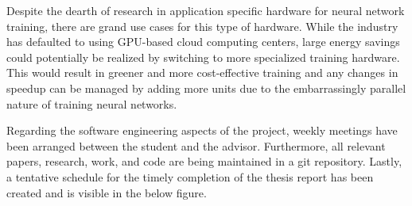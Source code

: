 \documentclass[a4paper]{article}
\begin{document}
\par 
Despite the dearth of research in application specific hardware for neural network training, there are grand use cases for this type of hardware. While the industry has defaulted to using GPU-based cloud computing centers, large energy savings could potentially be realized by switching to more specialized training hardware. This would result in greener and more cost-effective training and any changes in speedup can be managed by adding more units due to the embarrassingly parallel nature of training neural networks.
\par 
Regarding the software engineering aspects of the project, weekly meetings have been arranged between the student and the advisor. Furthermore, all relevant papers, research, work, and code are being maintained in a git repository. Lastly, a tentative schedule for the timely completion of the thesis report has been created and is visible in the below figure.
\end{document}
